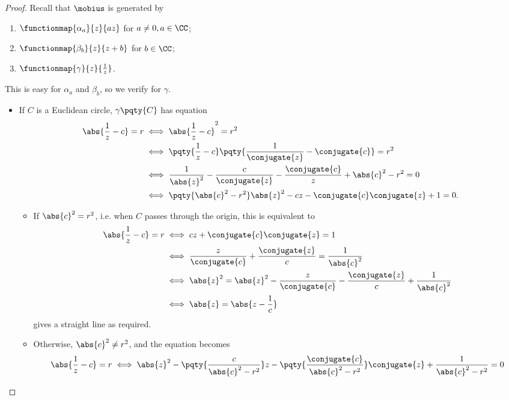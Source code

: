 \begin{proof}
    Recall that \(\mobius\) is generated by
    \begin{enumerate}
        \item \(\functionmap{\alpha_{a}}{z}{az}\) for \(a \neq 0, a \in \CC\);
        \item \(\functionmap{\beta_{b}}{z}{z + b}\) for \(b \in \CC\);
        \item \(\functionmap{\gamma}{z}{\frac{1}{z}}\).
    \end{enumerate}

    This is easy for \(\alpha_a\) and \(\beta_b\), so we verify for \(\gamma\).
    \begin{itemize}
        \item If \(C\) is a Euclidean circle, \(\gamma\pqty{C}\) has equation
        \begin{align*}
            \abs{\frac{1}{z} - c} = r &\iff \abs{\frac{1}{z} - c}^2 = r^2 \\
            &\iff \pqty{\frac{1}{z} - c} \pqty{\frac{1}{\conjugate{z}} - \conjugate{c}} = r^2 \\
            &\iff \frac{1}{\abs{z}^2} - \frac{c}{\conjugate{z}} - \frac{\conjugate{c}}{z} + \abs{c}^2 - r^2 = 0 \\
            &\iff \pqty{\abs{c}^2 - r^2} \abs{z}^2 - cz - \conjugate{c} \conjugate{z} + 1 = 0.
        \end{align*}
        \begin{itemize}
            \item If \(\abs{c}^2 = r^2\), i.e. when \(C\) passes through the origin, this is equivalent to
            \begin{align*}
                \abs{\frac{1}{z} - c} = r &\iff cz + \conjugate{c} \conjugate{z} = 1 \\
                &\iff \frac{z}{\conjugate{c}} + \frac{\conjugate{z}}{c} = \frac{1}{\abs{c}^2} \\
                &\iff \abs{z}^2 = \abs{z}^2 - \frac{z}{\conjugate{c}} - \frac{\conjugate{z}}{c} + \frac{1}{\abs{c}^2} \\
                &\iff \abs{z} = \abs{z - \frac{1}{c}}
            \end{align*}
            gives a straight line as required.
            \item Otherwise, \(\abs{c}^2 \neq r^2\), and the equation becomes
            \begin{align*}
                \abs{\frac{1}{z} - c} = r &\iff \abs{z}^2 - \pqty{\frac{c}{\abs{c}^2 - r^2}} z - \pqty{\frac{\conjugate{c}}{\abs{c}^2 - r^2}} \conjugate{z} + \frac{1}{\abs{c}^2 - r^2} = 0 \\

\end{align*}
\end{itemize}
\end{itemize}
\end{proof}
